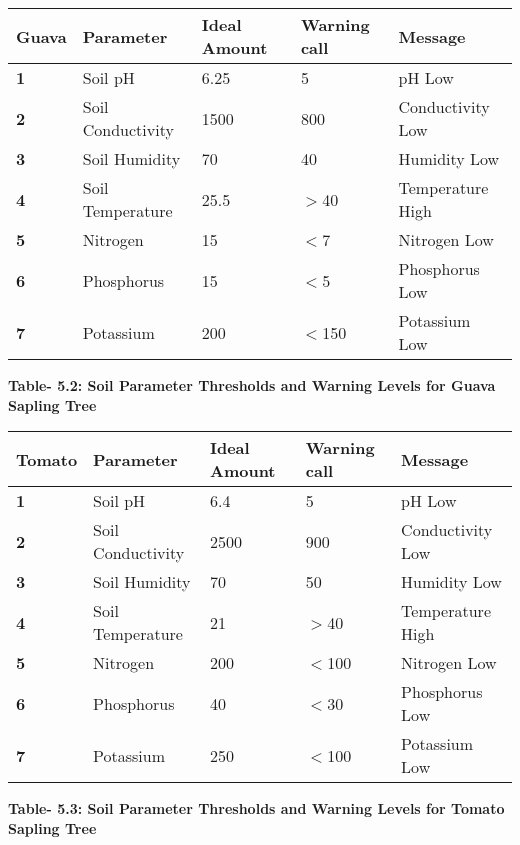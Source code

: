 \documentclass{book} %
\begin{document}
\begin{tabular}{|p{0.7in}|p{0.8in}|p{0.8in}|p{0.7in}|p{1.0in}|} \hline 
\textbf{Guava} & \textbf{Parameter} & \textbf{Ideal Amount} & \textbf{Warning call} & \textbf{Message} \\ \hline 
\textbf{1} & Soil pH & 6.25 & 5 & pH Low \\ \hline 
\textbf{2} & Soil Conductivity & 1500 & 800 & Conductivity Low \\ \hline 
\textbf{3} & Soil Humidity & 70 & 40 & Humidity Low \\ \hline 
\textbf{4} & Soil Temperature & 25.5 & $\mathrm{>}$40 & Temperature High \\ \hline 
\textbf{5} & Nitrogen\newline  & 15 & $\mathrm{<}$7 & Nitrogen Low \\ \hline 
\textbf{6} & Phosphorus & 15 & $\mathrm{<}$5 & Phosphorus Low \\ \hline 
\textbf{7} & Potassium & 200 & $\mathrm{<}$150 & Potassium Low \\ \hline 
\end{tabular}

 \textbf{Table- 5.2: Soil Parameter Thresholds and Warning Levels for Guava Sapling Tree}

\begin{tabular}{|p{0.7in}|p{0.8in}|p{0.8in}|p{0.7in}|p{1.0in}|} \hline 
\textbf{Tomato} & \textbf{Parameter} & \textbf{Ideal Amount} & \textbf{Warning call} & \textbf{Message} \\ \hline 
\textbf{1} & Soil pH & 6.4 & 5 &  pH Low \\ \hline 
\textbf{2} & Soil Conductivity & 2500 & 900 & Conductivity Low \\ \hline 
\textbf{3} & Soil Humidity & 70 & 50 & Humidity Low \\ \hline 
\textbf{4} & Soil Temperature & 21 & $\mathrm{>}$40 & Temperature High \\ \hline 
\textbf{5} & Nitrogen & 200 & $\mathrm{<}$100 & Nitrogen Low \\ \hline 
\textbf{6} & Phosphorus & 40 & $\mathrm{<}$30 & Phosphorus Low \\ \hline 
\textbf{7} & Potassium & 250 & $\mathrm{<}$100 & Potassium Low \\ \hline 
\end{tabular}

 \textbf{Table- 5.3: Soil Parameter Thresholds and Warning Levels for Tomato Sapling Tree}

\noindent 
\end{document}
